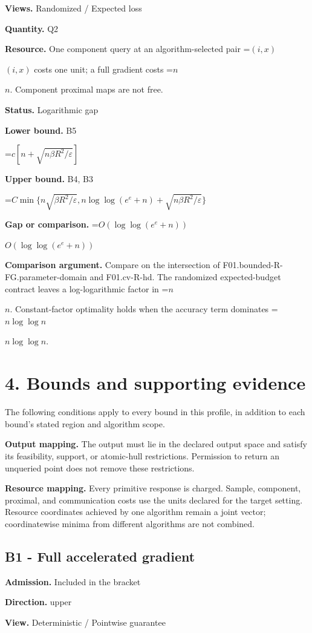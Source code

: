 \documentclass[10pt,a4paper]{article}
\newcommand{\AtlasMath}[1]{\par\begingroup\centering\setbox0=\hbox{$\displaystyle #1$}\ifdim\wd0>1.4\linewidth\typeout{ATLAS WIDE FORMULA: \the\wd0}\fi\ifdim\wd0>\linewidth\resizebox{\linewidth}{!}{\box0}\else\box0\fi\par\endgroup}
\newcommand{\AtlasInlineMath}[1]{\begingroup\setbox0=\hbox{$#1$}\ifdim\wd0>.4\linewidth\endgroup\AtlasMath{#1}\else\endgroup$#1$\fi}
\begin{document}
\textbf{Views.} Randomized / Expected loss

\textbf{Quantity.} Q2

\textbf{Resource.} One component query at an algorithm-selected pair \AtlasInlineMath{(i,x)} costs one unit; a full gradient costs \AtlasInlineMath{n}. Component proximal maps are not free.

\textbf{Status.} Logarithmic gap

\textbf{Lower bound.} B5

\AtlasMath{c[n+\sqrt{n\beta R^2/\varepsilon}]}
\textbf{Upper bound.} B4, B3

\AtlasMath{C\min\{n\sqrt{\beta R^2/\varepsilon},n\log\log(e^e+n)+\sqrt{n\beta R^2/\varepsilon}\}}
\textbf{Gap or comparison.} \AtlasInlineMath{O(\log\log(e^e+n))}

\textbf{Comparison argument.} Compare on the intersection of F01.bounded-R-FG.parameter-domain and F01.cv-R-hd. The randomized expected-budget contract leaves a log-logarithmic factor in \AtlasInlineMath{n}. Constant-factor optimality holds when the accuracy term dominates \AtlasInlineMath{n\log\log n}.

\section{4. Bounds and supporting evidence}
The following conditions apply to every bound in this profile, in addition to each bound's stated region and algorithm scope.

\textbf{Output mapping.} The output must lie in the declared output space and satisfy its feasibility, support, or atomic-hull restrictions. Permission to return an unqueried point does not remove these restrictions.

\textbf{Resource mapping.} Every primitive response is charged. Sample, component, proximal, and communication costs use the units declared for the target setting. Resource coordinates achieved by one algorithm remain a joint vector; coordinatewise minima from different algorithms are not combined.

\subsection{B1 - Full accelerated gradient}
\textbf{Admission.} Included in the bracket

\textbf{Direction.} upper

\textbf{View.} Deterministic / Pointwise guarantee
\end{document}
